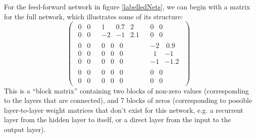 For the feed-forward network in figure \ref{labelledNets}, we can begin with a matrix for the full network, which illustrates some of its structure:
\begin{equation*}
   \left( 
   \begin{array} {c|c|c}
   \begin{matrix} 0 & 0  \\ 0 & 0 \end{matrix} &
   \begin{matrix} 1 & 0.7 & 2 \\ -2 & -1 & 2.1 \end{matrix} &
   \begin{matrix} 0 & 0  \\ 0 & 0 \end{matrix} \\
   \hline
   \begin{matrix} 0 & 0  \\  0 & 0  \\  0 & 0   \end{matrix} &
   \begin{matrix} 0 & 0 & 0  \\ 0 & 0 & 0 \\ 0 & 0 & 0  \end{matrix} &
   \begin{matrix} -2 & ~0.9  \\  ~~1 & -1  \\  -1 & -1.2  \end{matrix} \\
   \hline
   \begin{matrix} 0 & 0  \\ 0 & 0 \end{matrix} &
   \begin{matrix} 0 & 0 & 0  \\ 0 & 0 & 0 \end{matrix} &
   \begin{matrix} 0 & 0  \\ 0 & 0 \end{matrix}
   \end{array}
   \right)
\end{equation*}
This is a ``block matrix'' containing two blocks of non-zero values (corresponding to the layers that are connected), and 7 blocks of zeros (corresponding to possible layer-to-layer weight matrices that don't exist for this network, e.g. a recurrent layer from the hidden layer to itself, or a direct layer from the input to the output  layer). 
